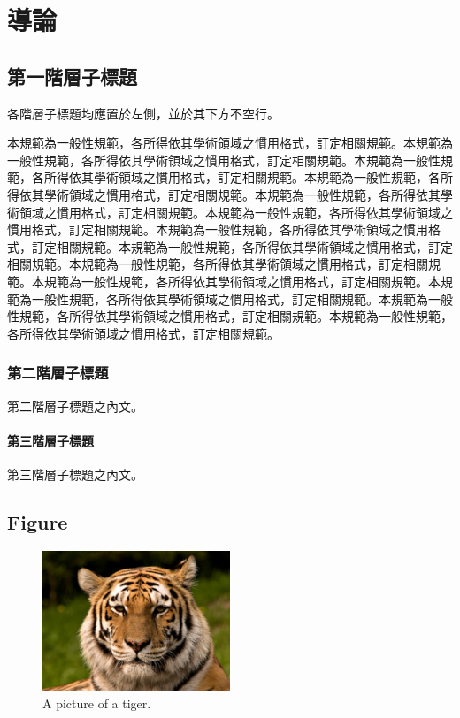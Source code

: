 \chapter{導論}
\label{c:1}

\section{第一階層子標題}

各階層子標題均應置於左側，並於其下方不空行。

本規範為一般性規範，各所得依其學術領域之慣用格式，訂定相關規範。本規範為一般性規範，各所得依其學術領域之慣用格式，訂定相關規範。本規範為一般性規範，各所得依其學術領域之慣用格式，訂定相關規範。本規範為一般性規範，各所得依其學術領域之慣用格式，訂定相關規範。本規範為一般性規範，各所得依其學術領域之慣用格式，訂定相關規範。本規範為一般性規範，各所得依其學術領域之慣用格式，訂定相關規範。本規範為一般性規範，各所得依其學術領域之慣用格式，訂定相關規範。本規範為一般性規範，各所得依其學術領域之慣用格式，訂定相關規範。本規範為一般性規範，各所得依其學術領域之慣用格式，訂定相關規範。本規範為一般性規範，各所得依其學術領域之慣用格式，訂定相關規範。本規範為一般性規範，各所得依其學術領域之慣用格式，訂定相關規範。本規範為一般性規範，各所得依其學術領域之慣用格式，訂定相關規範。本規範為一般性規範，各所得依其學術領域之慣用格式，訂定相關規範。

\subsection{第二階層子標題}

第二階層子標題之內文。

\subsubsection{第三階層子標題}

第三階層子標題之內文。



\section{Figure}
\label{ss:Figure}
\begin{figure}[htpb!]
  \centering
    \includegraphics[width=0.5\textwidth]{fig/tiger.jpeg}
    \caption{\label{fig:tiger}A picture of a tiger.}
\end{figure}

